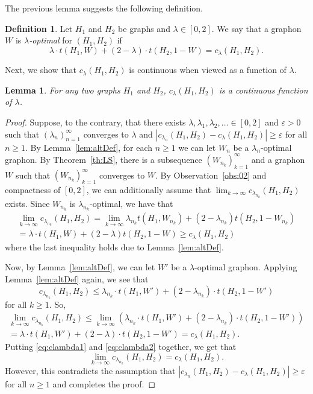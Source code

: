 \documentclass[12pt]{article}
\numberwithin{equation}{section}
\newtheorem{lem}[equation]{Lemma}
\theoremstyle{definition}
\newtheorem{defn}[equation]{Definition}
\theoremstyle{remark}
\begin{document}
The previous lemma suggests the following definition.

\begin{defn}
Let $H_1$ and $H_2$ be graphs and $\lambda\in [0,2]$. We say that a graphon $W$ is \emph{$\lambda$-optimal} for $(H_1,H_2)$ if 
\[\lambda\cdot t(H_1,W) + (2-\lambda)\cdot t(H_2,1-W) = c_\lambda(H_1,H_2).\]
\end{defn}

Next, we show that $c_\lambda(H_1,H_2)$ is continuous when viewed as a function of $\lambda$.

\begin{lem}
\label{lem:cont}
For any two graphs $H_1$ and $H_2$, $c_\lambda(H_1,H_2)$ is a continuous function of $\lambda$. 
\end{lem}

\begin{proof}
Suppose, to the contrary, that there exists $\lambda,\lambda_1,\lambda_2,\ldots\in [0,2]$ and $\varepsilon>0$ such that $(\lambda_n)_{n=1}^\infty$ converges to $\lambda$ and $|c_{\lambda_n}(H_1,H_2)-c_\lambda(H_1,H_2)|\geq \varepsilon$ for all $n\geq1$. By Lemma~\ref{lem:altDef}, for each $n\geq1$ we can let $W_n$ be a $\lambda_n$-optimal graphon. By Theorem~\ref{th:LS}, there is a subsequence $(W_{n_k})_{k=1}^\infty$ and a graphon $W$ such that $(W_{n_k})_{k=1}^\infty$ converges to $W$. By Observation~\ref{obs:02} and compactness of $[0,2]$, we can additionally assume that $\lim_{k\to\infty}c_{\lambda_{n_k}}(H_1,H_2)$ exists. Since $W_{n_k}$ is $\lambda_{n_k}$-optimal, we have that
\begin{equation}\label{eq:clambda1}
\begin{gathered}
\lim_{k\to\infty} c_{\lambda_{n_k}}(H_1,H_2) = \lim_{k\to\infty} \lambda_{n_k}t(H_1,W_{n_k})+(2-\lambda_{n_k})t(H_2,1-W_{n_k})\\= \lambda\cdot t(H_1,W) + (2-\lambda)t(H_2,1-W)\geq c_\lambda(H_1,H_2)\end{gathered}\end{equation}
where the last inequality holds due to Lemma~\ref{lem:altDef}.

Now, by Lemma~\ref{lem:altDef}, we can let $W'$ be a $\lambda$-optimal graphon. Applying Lemma~\ref{lem:altDef} again, we see that 
\[c_{\lambda_{n_k}}(H_1,H_2)\leq \lambda_{n_k}\cdot t(H_1,W')+(2-\lambda_{n_k})\cdot t(H_2,1-W')\]
for all $k\geq1$. So, 
\begin{equation}
\label{eq:clambda2}
\begin{gathered}
\lim_{k\to\infty}c_{\lambda_{n_k}}(H_1,H_2)\leq \lim_{k\to\infty}\left(\lambda_{n_k}\cdot t(H_1,W')+(2-\lambda_{n_k})\cdot t(H_2,1-W')\right)\\
=\lambda\cdot t(H_1,W')+(2-\lambda)\cdot t(H_2,1-W') = c_\lambda(H_1,H_2).
\end{gathered}
\end{equation}
Putting \eqref{eq:clambda1} and \eqref{eq:clambda2} together, we get that 
\[\lim_{k\to\infty}c_{\lambda_{n_k}}(H_1,H_2) = c_\lambda(H_1,H_2).\]
However, this contradicts the assumption that $|c_{\lambda_n}(H_1,H_2)-c_\lambda(H_1,H_2)|\geq \varepsilon$ for all $n\geq1$ and completes the proof.
\end{proof}
\end{document}
